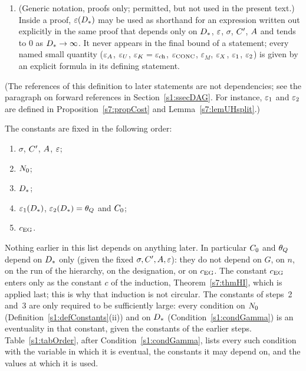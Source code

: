 \begin{definition}
\begin{enumerate}
\item[(vii)] (Generic notation, proofs only; permitted, but not used in the
present text.) Inside a proof, $\varepsilon(D_{*})$ may be
used as shorthand for an expression written out explicitly in the same proof
that depends only on $D_{*}$, $\varepsilon$, $\sigma$, $C'$, $A$ and tends to $0$ as
$D_{*}\to\infty$. It never appears in the final bound of a statement; every
named small quantity ($\varepsilon_{A}$, $\varepsilon_{U}$, $\varepsilon_{K}=\varepsilon_{\mathrm{ch}}$, $\varepsilon_{\mathrm{CONC}}$,
$\varepsilon_M$, $\varepsilon_{X}$, $\varepsilon_{1}$, $\varepsilon_{2}$) is given by an explicit formula
in its defining statement.
\end{enumerate}
{\small\noindent(The references of this definition to later statements are not
dependencies; see the paragraph on forward references in
Section~\ref{s1:ssecDAG}. For instance, $\varepsilon_{1}$ and $\varepsilon_{2}$ are defined in
Proposition~\ref{s7:propCost} and Lemma~\ref{s7:lemUHsplit}.)\par}
\end{definition}

\begin{remark}\label{s1:remOrder}
The constants are fixed in the following order:
\begin{enumerate}
\item $\sigma$, $C'$, $A$, $\varepsilon$;
\item $N_{0}$;
\item $D_{*}$;
\item $\varepsilon_{1}(D_{*})$, $\varepsilon_{2}(D_{*})=\theta_{Q}$ and $C_{0}$;
\item $c_{\mathrm{EG}}$.
\end{enumerate}
Nothing earlier in this list depends on anything later. In particular $C_{0}$
and $\theta_{Q}$ depend on $D_{*}$ only (given the fixed $\sigma,C',A,\varepsilon$):
they do not depend on $G$, on $n$, on the run of the hierarchy, on the
designation, or on $c_{\mathrm{EG}}$. The constant $c_{\mathrm{EG}}$ enters only as the constant $c$
of the induction, Theorem~\ref{s7:thmHI}, which is applied last; this is why
that induction is not circular. The constants of steps~2 and~3 are only required to be sufficiently
large: every condition on $N_{0}$ (Definition~\ref{s1:defConstants}(ii)) and on
$D_{*}$ (Condition~\ref{s1:condGamma}) is an eventuality in that constant, given
the constants of the earlier steps. Table~\ref{s1:tabOrder}, after
Condition~\ref{s1:condGamma}, lists every such condition with the variable in
which it is eventual, the constants it may depend on, and the values at which it
is used.
\end{remark}

